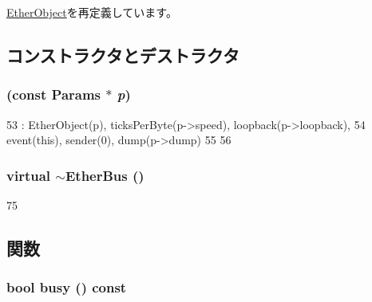 \hyperlink{classEtherObject_a47be5a25ff75cbf22f60f87dde950e13}{EtherObject}を再定義しています。

\subsection{コンストラクタとデストラクタ}
\hypertarget{classEtherBus_ab73501ab17a42dc39bad5da11f6e490a}{
\subsubsection[{EtherBus}]{ (const {\bf Params} $\ast$ {\em p})}}
\label{classEtherBus_ab73501ab17a42dc39bad5da11f6e490a}



\begin{DoxyCode}
53     : EtherObject(p), ticksPerByte(p->speed), loopback(p->loopback),
54       event(this), sender(0), dump(p->dump)
55 {
56 }
\end{DoxyCode}
\hypertarget{classEtherBus_a05588250081fe8f1dba9e46b0ac85da5}{
\subsubsection[{$\sim$EtherBus}]{\setlength{\rightskip}{0pt plus 5cm}virtual $\sim${\bf EtherBus} ()}}
\label{classEtherBus_a05588250081fe8f1dba9e46b0ac85da5}



\begin{DoxyCode}
75 {}
\end{DoxyCode}


\subsection{関数}
\hypertarget{classEtherBus_ab4dfde754c39017408feef7294770646}{
\subsubsection[{busy}]{\setlength{\rightskip}{0pt plus 5cm}bool busy () const}}
\label{classEtherBus_ab4dfde754c39017408feef7294770646}



